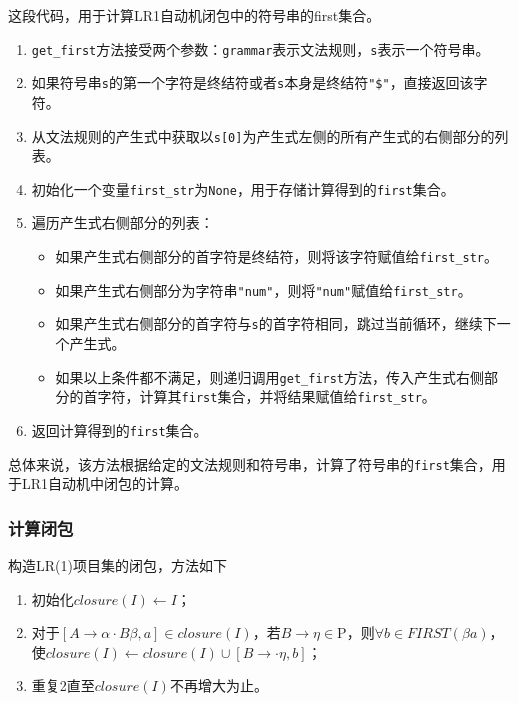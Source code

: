 \documentclass[lang=cn,11pt,a4paper]{elegantpaper}
\begin{document}
这段代码，用于计算LR1自动机闭包中的符号串的first集合。
\begin{enumerate}
    \item \lstinline{get_first}方法接受两个参数：\lstinline{grammar}表示文法规则，\lstinline{s}表示一个符号串。
    \item 如果符号串\lstinline{s}的第一个字符是终结符或者\lstinline{s}本身是终结符\lstinline{"$"}，直接返回该字符。
    \item 从文法规则的产生式中获取以\lstinline{s[0]}为产生式左侧的所有产生式的右侧部分的列表。
    \item 初始化一个变量\lstinline{first_str}为\lstinline{None}，用于存储计算得到的\lstinline{first}集合。
    \item 遍历产生式右侧部分的列表：
    \begin{itemize}
        \item 如果产生式右侧部分的首字符是终结符，则将该字符赋值给\lstinline{first_str}。
        \item 如果产生式右侧部分为字符串\lstinline{"num"}，则将\lstinline{"num"}赋值给\lstinline{first_str}。
        \item 如果产生式右侧部分的首字符与\lstinline{s}的首字符相同，跳过当前循环，继续下一个产生式。
        \item 如果以上条件都不满足，则递归调用\lstinline{get_first}方法，传入产生式右侧部分的首字符，计算其\lstinline{first}集合，并将结果赋值给\lstinline{first_str}。
    \end{itemize}
    \item 返回计算得到的\lstinline{first}集合。
\end{enumerate}


总体来说，该方法根据给定的文法规则和符号串，计算了符号串的\lstinline{first}集合，用于LR1自动机中闭包的计算。

\subsubsection{计算闭包}

构造LR(1)项目集的闭包，方法如下

\begin{enumerate}
    \item 初始化$closure(I)\leftarrow I$；
    \item 对于$[A\rightarrow \alpha\cdot B\beta, a]\in closure(I)$，若$B\rightarrow\eta\in \mathrm P$，则$\forall b\in FIRST(\beta a)$，使$closure(I)\leftarrow closure(I)\cup [B\rightarrow \cdot \eta,b]$；
    \item 重复2直至$closure(I)$不再增大为止。
\end{enumerate}
\end{document}
